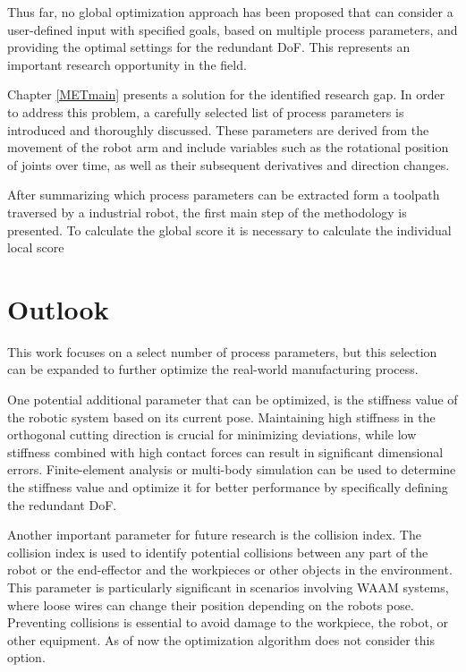 Thus far, no global optimization approach has been proposed that can consider a user-defined input with specified goals, based on multiple process parameters, and providing the optimal settings for the redundant \acrshort{DoF}. This represents an important research opportunity in the field.

Chapter \ref{METmain} presents a solution for the identified research gap. In order to address this problem, a carefully selected list of process parameters is introduced and thoroughly discussed. These parameters are derived from the movement of the robot arm and include variables such as the rotational position of joints over time, as well as their subsequent derivatives and direction changes.

After summarizing which process parameters can be extracted form a toolpath traversed by a industrial robot, the first main step of the methodology is presented. To calculate the global score it is necessary to calculate the individual local score 

\section{Outlook}%

This work focuses on a select number of process parameters, but this selection can be expanded to further optimize the real-world manufacturing process.

One potential additional parameter that can be optimized, is the stiffness value of the robotic system based on its current pose. Maintaining high stiffness in the orthogonal cutting direction is crucial for minimizing deviations, while low stiffness combined with high contact forces can result in significant dimensional errors. Finite-element analysis or multi-body simulation can be used to determine the stiffness value and optimize it for better performance by specifically defining the redundant \acrshort{DoF}.

Another important parameter for future research is the collision index. The collision index is used to identify potential collisions between any part of the robot or the end-effector and the workpieces or other objects in the environment. This parameter is particularly significant in scenarios involving \acrshort{WAAM} systems, where loose wires can change their position depending on the robots pose. Preventing collisions is essential to avoid damage to the workpiece, the robot, or other equipment. As of now the optimization algorithm does not consider this option.

